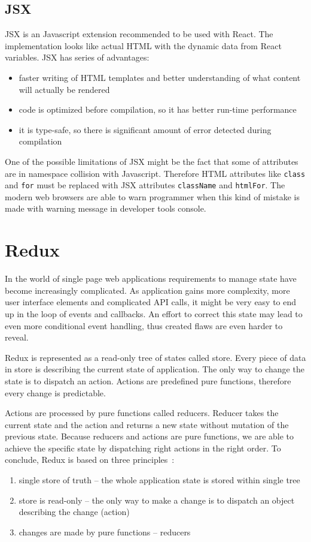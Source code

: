\newpage
\subsection{JSX} 
JSX \cite{JSX} is an Javascript extension recommended to be used with React. The implementation looks like actual HTML with the dynamic data from React variables. JSX has series of advantages:
\begin{itemize}
\item faster writing of HTML templates and better understanding of what content will actually be rendered
\item code is optimized before compilation, so it has better run-time performance
\item it is type-safe, so there is significant amount of error detected during compilation
\end{itemize}  

One of the possible limitations of JSX might be the fact that some of attributes are in namespace collision with Javascript. Therefore HTML attributes like \texttt{class} and \texttt{for} must be replaced with JSX attributes \texttt{className} and \texttt{htmlFor}. The modern web browsers are able to warn programmer when this kind of mistake is made with warning message in developer tools console. 

\section{Redux}
In the world of single page web applications requirements to manage state have become increasingly complicated. As application gains more complexity, more user interface elements and complicated API calls, it might be very easy to end up in the loop of events and callbacks. An effort to correct this state may lead to even more conditional event handling, thus created flaws are even harder to reveal.

Redux is represented as a read-only tree of states called store. Every piece of data in store is describing the current state of application. The only way to change the state is to dispatch an action. Actions are predefined pure functions, therefore every change is predictable.

Actions are processed by pure functions called reducers. Reducer takes the current state and the action and returns a new state without mutation of the previous state. Because reducers and actions are pure functions, we are able to achieve the specific state by dispatching right actions in the right order. To conclude, Redux is based on three principles~\cite{treePrinciples}:
\begin{enumerate}
\item single store of truth -- the whole application state is stored within single tree
\item store is read-only -- the only way to make a change is to dispatch an object describing the change (action)
\item changes are made by pure functions -- reducers 
\end{enumerate}

